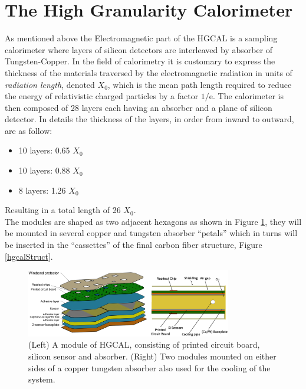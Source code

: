 \section{The High Granularity Calorimeter}
As mentioned above the Electromagnetic part of the HGCAL is a sampling calorimeter where layers of silicon detectors are interleaved by absorber of Tungsten-Copper.
In the field of calorimetry it is customary to express the thickness of the materials traversed by the electromagnetic radiation in units of \textit{radiation length}, denoted $X_0$, which is the mean path length required to reduce the energy of relativistic charged particles by a factor $1/\mathrm {e}$. The calorimeter is then composed of 28 layers each having an absorber and a plane of silicon detector. In details the thickness of the layers, in order from inward to outward, are as follow:
\begin{itemize}
\item 10 layers: 0.65 $X_0$
\item 10 layers: 0.88 $X_0$
\item 8 layers: 1.26 $X_0$
\end{itemize}
Resulting in a total length of 26 $X_0$.\\
The modules are shaped as two adjacent hexagons as shown in Figure \ref{hgcalMod}, they will be mounted in several copper and tungsten absorber ``petals'' which in turns will be inserted in the ``cassettes'' of the final carbon fiber structure, Figure \ref{hgcalStruct}.

\begin{figure}
\centerline{\includegraphics[width=0.8\textwidth]{intro/hgcalMod.png}}
\caption{(Left) A module of HGCAL, consisting of printed circuit board, silicon sensor and absorber. (Right) Two modules mounted on either sides of a copper tungsten absorber also used for the cooling of the system.}
\label{hgcalMod}
\end{figure}

